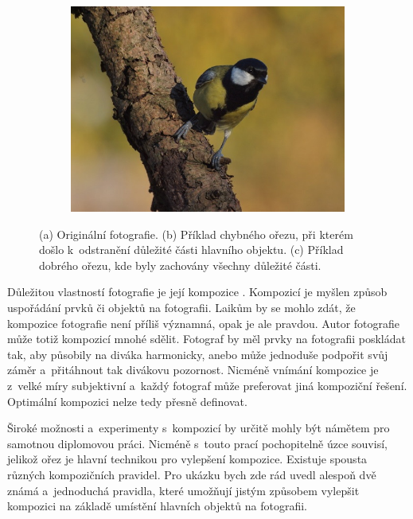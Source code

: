 \begin{figure}[H]
\begin{subfigure}{0.32\textwidth}
      \caption{}
    \end{subfigure}
    \begin{subfigure}{0.32\textwidth}
      \centering
      \includegraphics[scale=1.0]{obrazky/sykora-good.jpg}
      \caption{}
    \end{subfigure}
\caption{(a) Originální fotografie. (b) Příklad chybného ořezu, při kterém došlo k~odstranění důležité části hlavního objektu. (c) Příklad dobrého ořezu, kde byly zachovány všechny důležité části.}
\label{obr:goodXbadCrop}
\end{figure}

Důležitou vlastností fotografie je její kompozice \cite{Freeman2012}. Kompozicí je myšlen způsob uspořádání prvků či objektů na fotografii. Laikům by se mohlo zdát, že kompozice fotografie není příliš významná, opak je ale pravdou. Autor fotografie může totiž kompozicí mnohé sdělit. Fotograf by měl prvky na fotografii poskládat tak, aby působily na diváka harmonicky, anebo může jednoduše podpořit svůj záměr a~přitáhnout tak divákovu pozornost. Nicméně vnímání kompozice je z~velké míry subjektivní a~každý fotograf může preferovat jiná kompoziční řešení. Optimální kompozici nelze tedy přesně definovat. 

Široké možnosti a~experimenty s~kompozicí by určitě mohly být námětem pro samotnou diplomovou práci. Nicméně s~touto prací pochopitelně úzce souvisí, jelikož ořez je hlavní technikou pro vylepšení kompozice. Existuje spousta různých kompozičních pravidel. Pro ukázku bych zde rád uvedl alespoň dvě známá a~jednoduchá pravidla, které umožňují jistým způsobem vylepšit kompozici na základě umístění hlavních objektů na fotografii.

